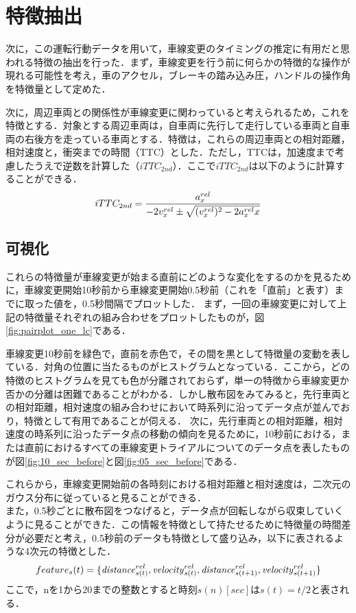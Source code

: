 \section{特徴抽出}
次に，この運転行動データを用いて，車線変更のタイミングの推定に有用だと思われる特徴の抽出を行った．まず，車線変更を行う前に何らかの特徴的な操作が現れる可能性を考え，車のアクセル，ブレーキの踏み込み圧，ハンドルの操作角を特徴量として定めた．
\par
次に，周辺車両との関係性が車線変更に関わっていると考えられるため，これを特徴とする．対象とする周辺車両は，自車両に先行して走行している車両と自車両の右後方を走っている車両とする．特徴は，これらの周辺車両との相対距離，相対速度と，衝突までの時間（TTC）とした．ただし，TTCは，加速度まで考慮したうえで逆数を計算した（$iTTC_{2nd}$）．ここで$iTTC_{2nd}$は以下のように計算することができる．
\begin{align}
  iTTC_{2nd}=\frac{a_x^{rel}}{-2v_x^{rel}\pm\sqrt{(v_x^{rel})^2-2{a_x^{rel}}x}}
\end{align}



\subsection{可視化}
これらの特徴量が車線変更が始まる直前にどのような変化をするのかを見るために，車線変更開始10秒前から車線変更開始0.5秒前（これを「直前」と表す）までに取った値を，0.5秒間隔でプロットした．
まず，一回の車線変更に対して上記の特徴量それぞれの組み合わせをプロットしたものが，図\ref{fig:pairplot_one_lc}である．

車線変更10秒前を緑色で，直前を赤色で，その間を黒として特徴量の変動を表している．対角の位置に当たるものがヒストグラムとなっている．ここから，どの特徴のヒストグラムを見ても色が分離されておらず，単一の特徴から車線変更か否かの分離は困難であることがわかる．しかし散布図をみてみると，先行車両との相対距離，相対速度の組み合わせにおいて時系列に沿ってデータ点が並んでおり，特徴として有用であることが伺える．
次に，先行車両との相対距離，相対速度の時系列に沿ったデータ点の移動の傾向を見るために，10秒前における，または直前におけるすべての車線変更トライアルについてのデータ点を表したものが図\ref{fig:10_sec_before}と図\ref{fig:05_sec_before}である．

これらから，車線変更開始前の各時刻における相対距離と相対速度は，二次元のガウス分布に従っていると見ることができる．
\\
また，0.5秒ごとに散布図をつなげると，データ点が回転しながら収束していくように見ることができた．この情報を特徴として持たせるために特徴量の時間差分が必要だと考え，0.5秒前のデータも特徴として盛り込み，以下に表されるような4次元の特徴とした．
\begin{align}
  feature_s(t)=\{\mathit{distance}_{s(t)}^{rel},\mathit{velocity}_{s(t)}^{rel},\mathit{distance}_{s(t+1)}^{rel},\mathit{velocity}_{s(t+1)}^{rel}\}
\end{align}
ここで，nを1から20までの整数とすると時刻$s(n)[\mathit{sec}]$は$s(t) = t/2$と表される．
